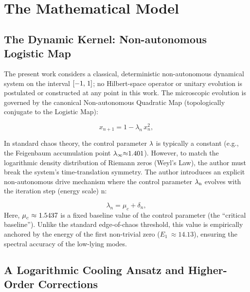 \documentclass[mca,article,submit,oneauthor,pdftex]{Definitions/mdpi}
\begin{document}
\section{The Mathematical Model}\label{sec:model}

\subsection{The Dynamic Kernel: Non-autonomous Logistic Map}

The present work considers a classical, deterministic non-autonomous dynamical system on
the interval \(\text{[\ensuremath{-}1, 1]}\); no Hilbert-space operator or
unitary evolution is postulated or constructed at any point in this work.
The microscopic evolution is
governed by the canonical Non-autonomous Quadratic Map (topologically
conjugate to the Logistic Map):

\begin{equation}\label{eq:map}
x_{n+1} = 1 - \lambda_n\, x_n^{2},
\end{equation}

In standard chaos theory, the control parameter \(\text{\ensuremath{\lambda}}\) is
typically a constant (e.g., the Feigenbaum accumulation point
\(\text{\ensuremath{\lambda}}_{\text{\ensuremath{\infty}}}\text{\ensuremath{\approx}1.401}\)). However, to match the logarithmic
density distribution of Riemann zeros (Weyl's Law), the author must break the
system's time-translation symmetry. The author introduces an explicit
non-autonomous drive mechanism where the control parameter
\(\text{\ensuremath{\lambda}}_{\text{n}}\) evolves with the iteration step (energy scale)
\(\text{n}\):

\begin{equation}\label{eq:split}
\lambda_n = \mu_c + \delta_n,
\end{equation}
Here, \(\text{\ensuremath{\mu}}_{{c}}~\text{\ensuremath{\approx}~1.5437}\) is a fixed baseline value of the control parameter (the ``critical baseline''). Unlike the standard edge-of-chaos
threshold, this value is empirically anchored by the energy of the first
non-trivial zero (\({E}_{{1}}~{\ensuremath{\approx}14.13}\)), ensuring
the spectral accuracy of the low-lying modes.

\subsection{A Logarithmic Cooling Ansatz and Higher-Order Corrections}
\end{document}
